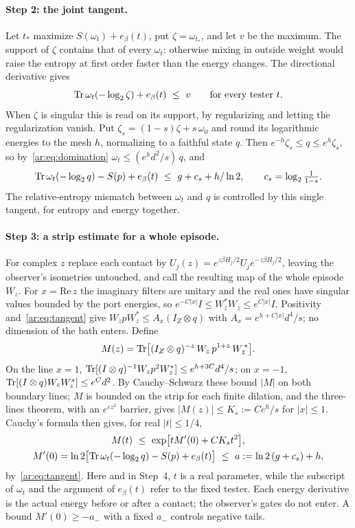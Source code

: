 \paragraph{Step 2: the joint tangent.} Let $t_*$ maximize $S(\omega_t)+e_\beta(t)$, put $\zeta=\omega_{t_*}$, and let $v$ be the maximum. The support of $\zeta$ contains that of every $\omega_t$: otherwise mixing in outside weight would raise the entropy at first order faster than the energy changes. The directional derivative gives
\[
\Tr\omega_t(-\log_2\zeta)+e_\beta(t)\ \le\ v\qquad\text{for every tester }t.
\]
When $\zeta$ is singular this is read on its support, by regularizing and letting the regularization vanish. Put $\zeta_s=(1-s)\zeta+s\,\omega_0$ and round its logarithmic energies to the mesh $h$, normalizing to a faithful state $q$. Then $e^{-h}\zeta_s\le q\le e^h\zeta_s$, so by~\eqref{ar:eq:domination} $\omega_t\le(e^hd^2/s)\,q$, and
\begin{equation}\label{ar:eq:tangent}
\operatorname{Tr}\omega_t(-\log_2q)-S(p)+e_\beta(t)\ \le\ g+c_s+h/\ln2,\qquad c_s=\log_2\tfrac1{1-s}.
\end{equation}
The relative-entropy mismatch between $\omega_t$ and $q$ is controlled by this single tangent, for entropy and energy together.

\paragraph{Step 3: a strip estimate for a whole episode.} For complex $z$ replace each contact by $U_j(z)=e^{z\beta H_j/2}U_je^{-z\beta H_j/2}$, leaving the observer's isometries untouched, and call the resulting map of the whole episode $W_z$. For $x=\mathrm{Re}\,z$ the imaginary filters are unitary and the real ones have singular values bounded by the port energies, so $e^{-C|x|}I\le W_z^*W_z\le e^{C|x|}I$. Positivity and~\eqref{ar:eq:tangent} give $W_zpW_z^*\le A_x(I_Z\otimes q)$ with $A_x=e^{h+C|x|}d^4/s$; no dimension of the bath enters. Define
\[
M(z)=\operatorname{Tr}\bigl[(I_Z\otimes q)^{-z}\,W_z\,p^{1+z}\,W_{\bar z}^{\,*}\bigr].
\]
On the line $x=1$, $\operatorname{Tr}[(I\otimes q)^{-1}W_zp^2W_z^*]\le e^{h+3C}d^4/s$; on $x=-1$, $\operatorname{Tr}[(I\otimes q)W_zW_z^*]\le e^Cd^2$. By Cauchy--Schwarz these bound $|M|$ on both boundary lines; $M$ is bounded on the strip for each finite dilation, and the three-lines theorem, with an $e^{\varepsilon z^2}$ barrier, gives $|M(z)|\le K_s:=Ce^h/s$ for $|x|\le1$. Cauchy's formula then gives, for real $|t|\le1/4$,
\[
\begin{gathered}
M(t)\ \le\ \exp\bigl[tM'(0)+CK_st^2\bigr],\\
M'(0)=\ln2\bigl[\Tr\omega_t(-\log_2q)-S(p)+e_\beta(t)\bigr]\ \le\ a:=\ln2\,(g+c_s)+h,
\end{gathered}
\]
by~\eqref{ar:eq:tangent}. Here and in Step~4, $t$ is a real parameter, while the subscript of $\omega_t$ and the argument of $e_\beta(t)$ refer to the fixed tester. Each energy derivative is the actual energy before or after a contact; the observer's gates do not enter. A bound $M'(0)\ge-a_-$ with a fixed $a_-$ controls negative tails.

